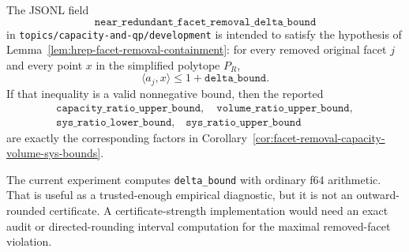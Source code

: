 \begin{unverified}
\begin{remark}
\label{rem:near-redundant-facet-removal-experiment-contract}
The JSONL field
\[
  \texttt{near\_redundant\_facet\_removal\_delta\_bound}
\]
in \texttt{topics/capacity-and-qp/development} is intended to satisfy the hypothesis of
Lemma~\ref{lem:hrep-facet-removal-containment}: for every removed original facet
$j$ and every point $x$ in the simplified polytope $P_R$,
\[
  \langle a_j,x\rangle \leq 1+\texttt{delta\_bound}.
\]
If that inequality is a valid nonnegative bound, then the reported
\[
\begin{gathered}
  \texttt{capacity\_ratio\_upper\_bound},\quad
  \texttt{volume\_ratio\_upper\_bound},\\
  \texttt{sys\_ratio\_lower\_bound},\quad
  \texttt{sys\_ratio\_upper\_bound}
\end{gathered}
\]
are exactly the corresponding factors in
Corollary~\ref{cor:facet-removal-capacity-volume-sys-bounds}.

The current experiment computes \texttt{delta\_bound} with ordinary f64
arithmetic. That is useful as a trusted-enough empirical diagnostic, but it is
not an outward-rounded certificate. A certificate-strength implementation
would need an exact audit or directed-rounding interval computation for the
maximal removed-facet violation.
\end{remark}
\end{unverified}
